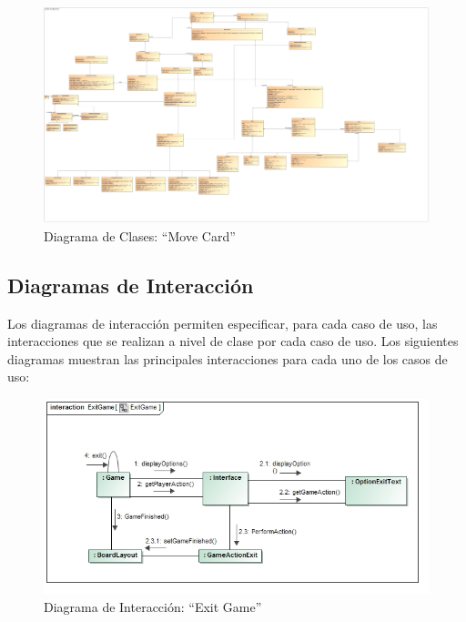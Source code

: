 \documentclass[11pt]{article}
\begin{document}
\begin{landscape}
\begin{center}
 \begin{figure}[H]
 \begin{center}
 \includegraphics[scale=0.18]{Analysis/MoveCard00.jpg}
   \caption{Diagrama de Clases: ``Move Card''}
   \label{fig:movecard}
 \end{center}
 \end{figure}
\end{center}
\end{landscape}
\restoregeometry

\subsection{Diagramas de Interacción} 

Los diagramas de interacción permiten especificar, para cada caso de uso, las interacciones que se realizan a nivel de clase por cada caso de uso. Los siguientes diagramas muestran las principales interacciones para cada uno de los casos de uso:

\begin{center}
 \begin{figure}[H]
 \begin{center}
   \includegraphics[width=16cm]{Analysis/ExitGameSequence00.jpg}
   \caption{Diagrama de Interacción: ``Exit Game''}
   \label{fig:exitgamesequence}
 \end{center}
 \end{figure}
\end{center}
\end{document}
